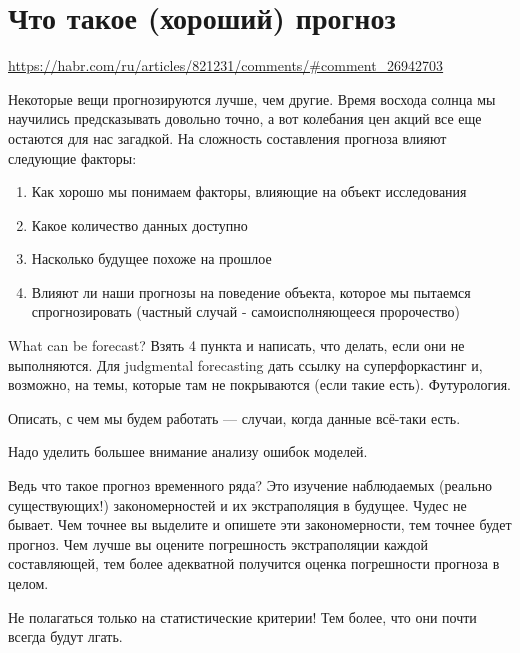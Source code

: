 \section{Что такое (хороший) прогноз}

\url{https://habr.com/ru/articles/821231/comments/#comment_26942703}


Некоторые вещи прогнозируются лучше, чем другие. Время восхода солнца
мы научились предсказывать довольно точно, а вот колебания цен акций
все еще остаются для нас загадкой. На сложность составления прогноза
влияют следующие факторы:

\begin{enumerate}
  \item Как хорошо мы понимаем факторы, влияющие на объект исследования
  \item Какое количество данных доступно
  \item Насколько будущее похоже на прошлое
  \item Влияют ли наши прогнозы на поведение объекта, которое мы
    пытаемся спрогнозировать (частный случай - самоисполняющееся пророчество)
\end{enumerate}

What can be forecast? Взять 4 пункта и написать, что делать, если они
не выполняются. Для judgmental forecasting дать ссылку на
суперфоркастинг и, возможно, на темы, которые там не покрываются
(если такие есть). Футурология.

Описать, с чем мы будем работать — случаи, когда данные всё-таки есть.

Надо уделить большее внимание анализу ошибок моделей.

Ведь что такое прогноз временного ряда? Это изучение наблюдаемых
(реально существующих!) закономерностей и их экстраполяция в будущее.
Чудес не бывает. Чем точнее вы выделите и опишете эти закономерности,
тем точнее будет прогноз. Чем лучше вы оцените погрешность
экстраполяции каждой составляющей, тем более адекватной получится
оценка погрешности прогноза в целом.

Не полагаться только на статистические критерии! Тем более, что они
почти всегда будут лгать.

